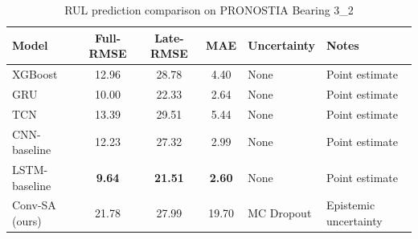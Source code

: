\begin{table}[h]
\centering
\caption{RUL prediction comparison on PRONOSTIA Bearing 3\_2}
\label{tab:rul_baselines}
\begin{tabular}{lcccll}
\toprule
Model & Full-RMSE & Late-RMSE & MAE & Uncertainty & Notes \\
\midrule
XGBoost & 12.96 & 28.78 & 4.40 & None & Point estimate \\
GRU & 10.00 & 22.33 & 2.64 & None & Point estimate \\
TCN & 13.39 & 29.51 & 5.44 & None & Point estimate \\
CNN-baseline & 12.23 & 27.32 & 2.99 & None & Point estimate \\
LSTM-baseline & \textbf{9.64} & \textbf{21.51} & \textbf{2.60} & None & Point estimate \\
Conv-SA (ours) & 21.78 & 27.99 & 19.70 & MC Dropout & Epistemic uncertainty \\
\bottomrule
\end{tabular}
\end{table}
